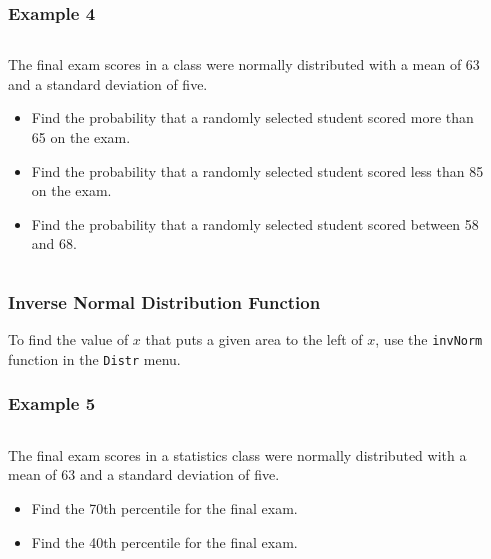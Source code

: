 \documentclass[12pt,twocolumn]{article}
\begin{document}
\begin{frame}[t]
 \frametitle{Example 4}
 \begin{columns}
  \begin{column}{0.5\textwidth}
    The final exam scores in a  class were normally distributed with a mean of 63 and a standard deviation of five.
    \begin{itemize}
     \item Find the probability that a randomly selected student scored more than 65 on the exam.
     \item Find the probability that a randomly selected student scored less than 85 on the exam.
     \item Find the probability that a randomly selected student scored between 58 and 68.
    \end{itemize}
  \end{column}
  \begin{column}{0.5\textwidth}
  \end{column}
 \end{columns}
\end{frame}

\begin{frame}[t]
 \frametitle{Inverse Normal Distribution Function}
 To find the value of $x$ that puts a given area to the left of $x$, use the \texttt{invNorm} function in the \texttt{Distr} menu.
\end{frame}

\begin{frame}[t]
 \frametitle{Example 5}
 \begin{columns}
  \begin{column}{0.5\textwidth}
    The final exam scores in a statistics class were normally distributed with a mean of 63 and a standard deviation of five.
    \begin{itemize}
     \item Find the 70th percentile for the final exam.
     \item Find the 40th percentile for the final exam.
    \end{itemize}
  \end{column}
  \begin{column}{0.5\textwidth}
  \end{column}
 \end{columns}
\end{frame}
\end{document}

